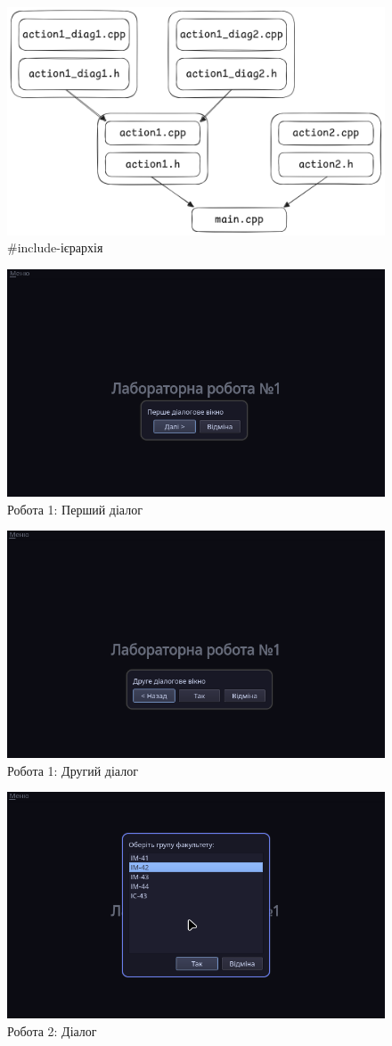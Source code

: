 \begin{figure}[ht!]
  \center\includegraphics[width=0.7\linewidth]{include_diagram.png}
	\caption{\#include-ієрархія}
\end{figure}
\begin{figure}[p]
  \center\includegraphics[width=0.7\linewidth]{action1_diag1.png}
	\caption{Робота 1: Перший діалог}
\end{figure}
\begin{figure}[p]
  \center\includegraphics[width=0.7\linewidth]{action1_diag2.png}
	\caption{Робота 1: Другий діалог}
\end{figure}
\begin{figure}[p]
  \center\includegraphics[width=0.7\linewidth]{action2_diag.png}
	\caption{Робота 2: Діалог}
\end{figure}
